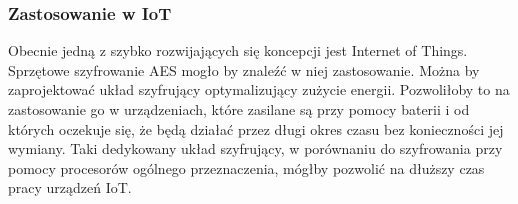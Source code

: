 \subsubsection{Zastosowanie w IoT}
Obecnie jedną z szybko rozwijających się koncepcji jest Internet of Things. Sprzętowe szyfrowanie AES mogło by znaleźć w niej zastosowanie. Można by zaprojektować układ szyfrujący optymalizujący zużycie energii. Pozwoliłoby to na zastosowanie go w urządzeniach, które zasilane są przy pomocy baterii i od których oczekuje się, że będą działać przez długi okres czasu bez konieczności jej wymiany. Taki dedykowany układ  szyfrujący, w porównaniu do szyfrowania przy pomocy procesorów ogólnego przeznaczenia, mógłby pozwolić na dłuższy czas pracy urządzeń IoT.




\newpage